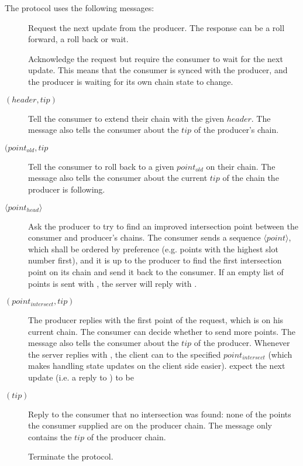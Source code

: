 The protocol uses the following messages:
\begin{description}
\item [\MsgRequestNext]
      Request the next update from the producer.  The response can be a roll
      forward, a roll back or wait.
\item [\MsgAwaitReply]
      Acknowledge the request but require the consumer to wait for the next update.
      This means that the consumer is synced with the producer, and
      the producer is waiting for its own chain state to change.
\item [\MsgRollForward{} {\boldmath $(header, tip)$}]
      Tell the consumer to extend their chain with the given $header$.
      The message also tells the consumer about the $tip$ of the producer's chain.
\item [\MsgRollBackward{} {\boldmath $(point_{old}, tip$}]
      Tell the consumer to roll back to a given $point_{old}$ on their chain.
      The message also tells the consumer about the current  $tip$ of the chain the producer is following.
\item [\MsgFindIntersect{} {\boldmath $\langle point_{head} \rangle $}]
      Ask the producer to try to find an improved intersection point between
      the consumer and producer's chains.
      The consumer sends a sequence {\boldmath $\langle point \rangle $}, which
      shall be ordered by preference (e.g. points with the highest slot number
      first), and it is up to the producer to find the first intersection point
      on its chain and send it back to the consumer.  If an empty list of
      points is sent with \MsgFindIntersect{}, the server will reply with
      \MsgIntersectNotFound{}.
\item [\MsgIntersectFound{} {\boldmath $(point_{intersect} ,tip)$}]
      The producer replies with the first point of the request, which is on his current chain.
      The consumer can decide whether to send more points.
      The message also tells the consumer about the $tip$ of the producer.
      Whenever the server replies with \MsgIntersectFound{}, the client can
      \MsgRollBackward{} to the specified $point_{intersect}$ (which makes
      handling state updates on the client side easier).
      expect the next update (i.e. a reply to \MsgRequestNext{}) to be
\item [\MsgIntersectNotFound{} {\boldmath $(tip)$}]
      Reply to the consumer that no intersection was found: none of the
      points the consumer supplied are on the producer chain.
      The message only contains the $tip$ of the producer chain.
\item [\MsgDone]
      Terminate the protocol.
\end{description}

